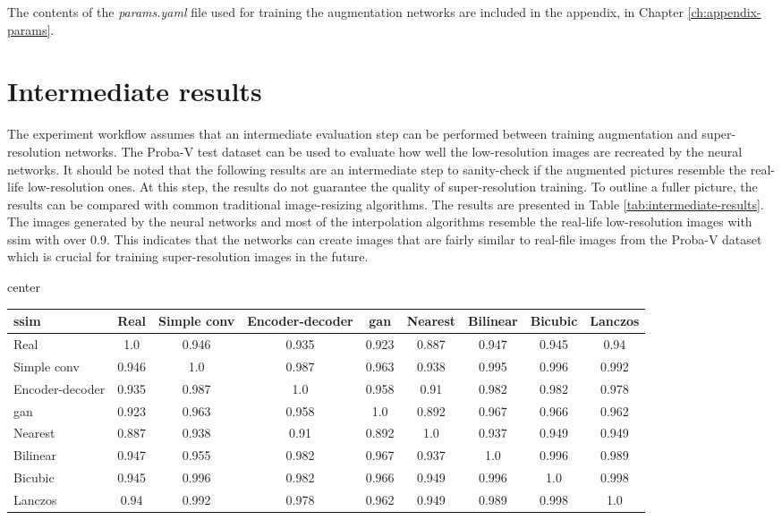 The contents of the \textit{params.yaml} file used for training the augmentation networks are included in the appendix, in Chapter \ref{ch:appendix-params}.

\section{Intermediate results}
The experiment workflow assumes that an intermediate evaluation step can be performed between training augmentation and super-resolution networks.
The Proba-V test dataset can be used to evaluate how well the low-resolution images are recreated by the neural networks.
It should be noted that the following results are an intermediate step to sanity-check if the augmented pictures resemble the real-life low-resolution ones.
At this step, the results do not guarantee the quality of super-resolution training. 
To outline a fuller picture, the results can be compared with common traditional image-resizing algorithms.
The results are presented in Table \ref{tab:intermediate-results}.
The images generated by the neural networks and most of the interpolation algorithms resemble the real-life low-resolution images with \gls{ssim} with over 0.9.
This indicates that the networks can create images that are fairly similar to real-file images from the Proba-V dataset which is crucial for training super-resolution images in the future.
\begin{sidewaystable}
\centering
\caption{Intermediate results of evaluation on Proba-V test dataset (\gls{ssim} metric, the larger, the better)}
\label{tab:intermediate-results}
\begin{adjustbox}{center}
\begin{tabular}{lcccccccc}
\toprule
\gls{ssim}            & Real       & Simple conv & Encoder-decoder & \gls{gan} & Nearest & Bilinear & Bicubic & Lanczos \\
\midrule
Real             &      1.0       &    0.946     & 0.935 &   0.923     &   0.887       & 0.947 & 0.945 & 0.94 \\
Simple conv      & 0.946 & 1.0 &   0.987  &  0.963  & 0.938 & 0.995 & 0.996 & 0.992 \\
Encoder-decoder & 0.935 & 0.987 &  1.0   &     0.958  & 0.91 & 0.982 & 0.982 & 0.978  \\
\gls{gan}              &   0.923          &  0.963             &   0.958  & 1.0 & 0.892 &     0.967    & 0.966 & 0.962 \\
Nearest          & 0.887 & 0.938 &   0.91  & 0.892 & 1.0 & 0.937 & 0.949 & 0.949 \\
Bilinear         & 0.947 & 0.955 &    0.982 & 0.967 & 0.937 & 1.0 & 0.996    &  0.989 \\
Bicubic          & 0.945 & 0.996 &  0.982   & 0.966 & 0.949 & 0.996 &   1.0  & 0.998 \\
Lanczos          & 0.94& 0.992 &    0.978 & 0.962 & 0.949 & 0.989       & 0.998 & 1.0 \\
\bottomrule        
\end{tabular}
\end{adjustbox}
\end{sidewaystable}
